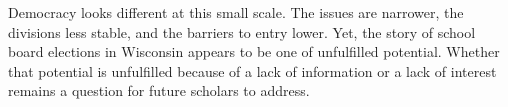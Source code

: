 Democracy looks different at this small scale. The issues are narrower, the 
divisions less stable, and the barriers to entry lower. Yet, the story of school 
board elections in Wisconsin appears to be one of unfulfilled potential. Whether 
that potential is unfulfilled because of a lack of information or a lack of interest 
remains a question for future scholars to address. 